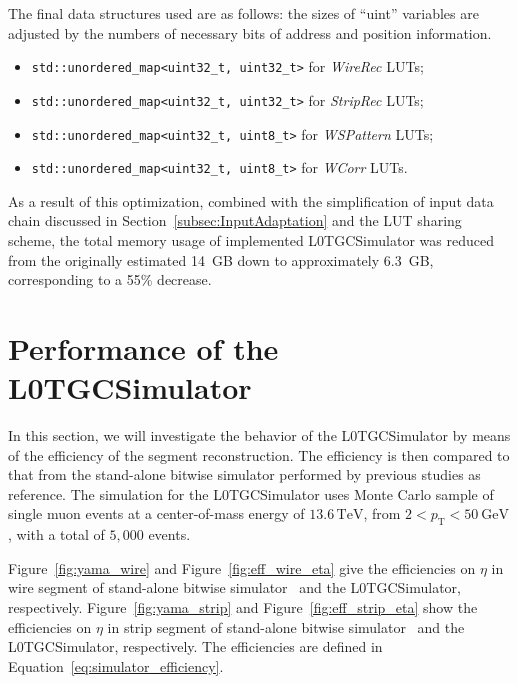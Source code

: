 The final data structures used are as follows: the sizes of ``uint'' variables are adjusted by the numbers of necessary bits of address and position information.
\begin{itemize}
  \item \texttt{std::unordered\_map<uint32\_t, uint32\_t>} for \textit{WireRec} LUTs;
  \item \texttt{std::unordered\_map<uint32\_t, uint32\_t>} for \textit{StripRec} LUTs;
  \item \texttt{std::unordered\_map<uint32\_t, uint8\_t>}  for \textit{WSPattern} LUTs;
  \item \texttt{std::unordered\_map<uint32\_t, uint8\_t>}  for \textit{WCorr} LUTs.
\end{itemize}

As a result of this optimization, combined with the simplification of input data chain discussed in Section~\ref{subsec:InputAdaptation} and the LUT sharing scheme, the total memory usage of implemented L0TGCSimulator was reduced from the originally estimated 14~GB down to approximately 6.3~GB, corresponding to a 55\% decrease.

\section{Performance of the L0TGCSimulator} \label{sec:L0MuonS1TGCPerformance}
In this section, we will investigate the behavior of the L0TGCSimulator by means of the efficiency of the segment reconstruction. The efficiency is then compared to that from the stand-alone bitwise simulator performed by previous studies as reference. The simulation for the L0TGCSimulator uses Monte Carlo sample of single muon events at a center-of-mass energy of $13.6\,\mathrm{TeV}$, from $2 < p_\mathrm{T} < 50~\text{GeV}$, with a total of $5{,}000$ events.

Figure~\ref{fig:yama_wire} and Figure~\ref{fig:eff_wire_eta} give the efficiencies on $\eta$ in wire segment of stand-alone bitwise simulator~\cite{yamashita} and the L0TGCSimulator, respectively. Figure~\ref{fig:yama_strip} and Figure~\ref{fig:eff_strip_eta} show the efficiencies on $\eta$ in strip segment of stand-alone bitwise simulator~\cite{yamashita} and the L0TGCSimulator, respectively. The efficiencies are defined in Equation~\ref{eq:simulator_efficiency}. 

